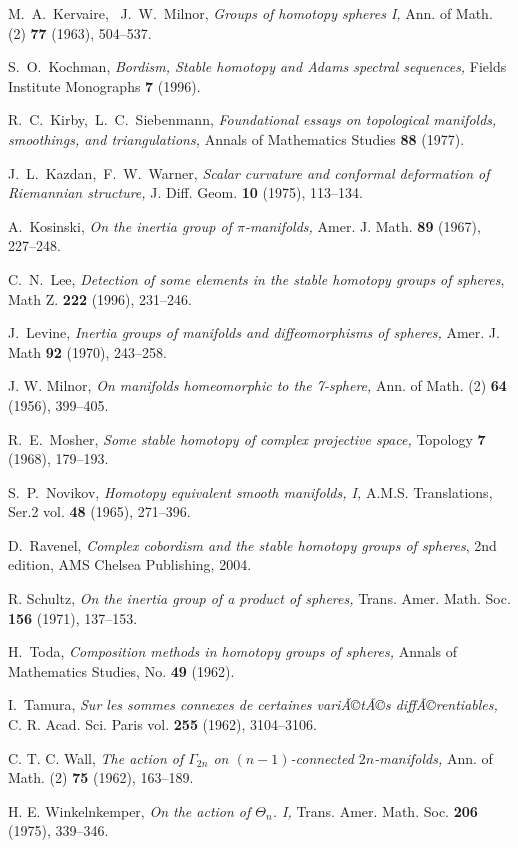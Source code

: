 \documentclass[a4paper,leqno,12pt]{amsart}
\theoremstyle{plain}
\theoremstyle{definition}
\numberwithin{equation}{section}
\begin{document}
\begin{thebibliography}{10}
 M.~A.~Kervaire,~ J.~W.~Milnor, {\em Groups of homotopy spheres I,} Ann. of Math. (2) \textbf{77} (1963), 504--537.

S.~O.~Kochman, {\em Bordism, Stable homotopy and Adams spectral sequences,} Fields Institute Monographs {\bf 7} (1996).

 R.~C.~Kirby,~L.~C.~Siebenmann, {\em Foundational essays on topological manifolds, smoothings, and triangulations,} Annals of Mathematics Studies \textbf{88} (1977).
 
 J.~L.~Kazdan,~F.~W.~Warner, {\em Scalar curvature and conformal deformation of Riemannian structure,} J. Diff. Geom. \textbf{10} (1975), 113--134.
 
 A.~Kosinski, {\em On the inertia group of $\pi$-manifolds,} Amer. J. Math. \textbf{89} (1967), 227--248.

 C.~N.~Lee, {\em Detection of some elements in the stable homotopy groups of spheres}, Math Z. {\bf 222} (1996), 231--246. 

J.~Levine, {\em Inertia groups of manifolds and diffeomorphisms of spheres,} Amer. J. Math {\bf 92} (1970), 243--258.

J. W. Milnor, {\em On manifolds homeomorphic to the 7-sphere,} Ann. of Math. (2) \textbf{64} (1956), 399--405.

 R.~E.~Mosher, {\em Some stable homotopy of complex projective space,} Topology {\bf 7} (1968), 179--193.

 S.~P.~Novikov, {\em Homotopy equivalent smooth manifolds, I,} A.M.S. Translations, Ser.2 vol. \textbf{48} (1965), 271--396.

 
 

 D.~Ravenel, {\em Complex cobordism and the stable homotopy groups of spheres}, 2nd edition, AMS Chelsea Publishing, 2004.

 R. Schultz, {\em On the inertia group of a product of spheres,} Trans. Amer. Math. Soc. \textbf{156} (1971), 137--153.

 H.~Toda, {\em Composition methods in homotopy groups of spheres,} Annals of Mathematics Studies, No. {\bf 49} (1962). 

I.~Tamura, {\em Sur les sommes connexes de certaines variÃ©tÃ©s diffÃ©rentiables,} C. R. Acad. Sci. Paris vol. \textbf{255} (1962), 3104--3106.

 C. T. C. Wall, {\em The action of $\Gamma_{2n}$ on $(n-1)$-connected $2n$-manifolds,} Ann. of Math. (2) \textbf{75} (1962), 163--189. 

  H. E. Winkelnkemper, {\em On the action of $\Theta_n$. I,} Trans. Amer. Math. Soc. \textbf{206} (1975), 339--346.

 \end{thebibliography}

\mbox{ }\\
\end{document}

